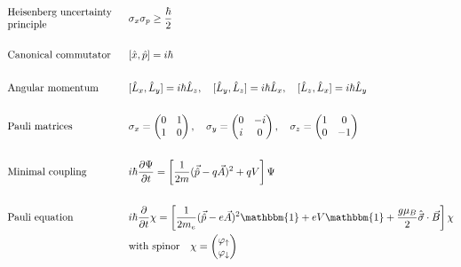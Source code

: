 \documentclass{article}[a4paper]
\begin{document}
\begin{minipage}[t]{0.5\textwidth}
\begin{align*}
    &&&\\
    &\textrm{\parbox{0.3\textwidth}{Heisenberg uncertainty \\ principle}} & ~&\sigma_x \sigma_p \geq \frac{\hbar}{2}\\
    &&&\\
    &\textrm{Canonical commutator} & ~&[\hat{x}, \hat{p}] = i\hbar\\
    &&&\\
    &\textrm{Angular momentum} & ~&[\hat{L}_x, \hat{L}_y] = i\hbar\hat{L}_z, \quad [\hat{L}_y, \hat{L}_z] = i\hbar\hat{L}_x, \quad [\hat{L}_z, \hat{L}_x] = i\hbar\hat{L}_y\\
    &&&\\
    &\textrm{Pauli matrices} & ~&\sigma_x = \begin{pmatrix} 0 & 1 \\ 1 & 0 \end{pmatrix}, \quad \sigma_y = \begin{pmatrix} 0 & -i \\ i & 0 \end{pmatrix}, \quad \sigma_z = \begin{pmatrix} 1 & 0 \\ 0 & -1 \end{pmatrix}\\
    &&&\\
    &\textrm{Minimal coupling} & ~&i\hbar \frac{\partial \Psi}{\partial t} = \left[\frac{1}{2m}(\vec{\hat{p}} - q \vec{A})^2 + q V \right] \Psi\\
    &&&\\
    &\textrm{Pauli equation} & ~&i\hbar \frac{\partial }{\partial t} \chi = \left[ \frac{1}{2m_e} (\vec{\hat{p}} - e \vec{A})^2 \mathbbm{1} + e V \mathbbm{1} + \frac{g \mu_B}{2} \hat{\vec{\sigma}}\cdot\vec{B} \right] \chi\\
    &&~&\textrm{with spinor}\quad\chi = \begin{pmatrix} \varphi_\uparrow \\ \varphi_\downarrow \end{pmatrix} \\
  \end{align*}%
\end{minipage}%
%
\end{document}
